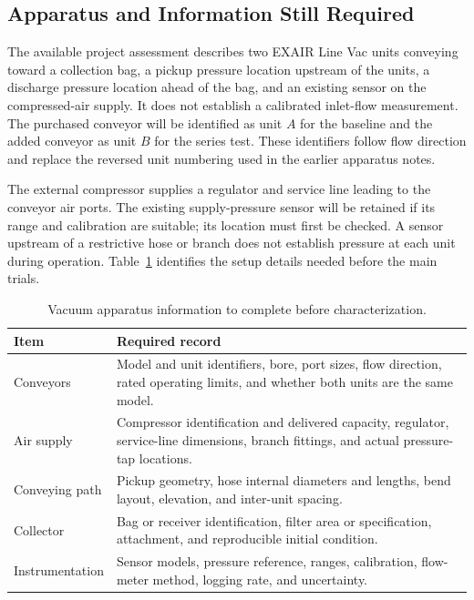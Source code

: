 \subsection{Apparatus and Information Still Required}
The available project assessment describes two EXAIR Line Vac units conveying toward a collection bag, a pickup pressure location upstream of the units, a discharge pressure location ahead of the bag, and an existing sensor on the compressed-air supply. It does not establish a calibrated inlet-flow measurement. The purchased conveyor will be identified as unit $A$ for the baseline and the added conveyor as unit $B$ for the series test. These identifiers follow flow direction and replace the reversed unit numbering used in the earlier apparatus notes.

The external compressor supplies a regulator and service line leading to the conveyor air ports. The existing supply-pressure sensor will be retained if its range and calibration are suitable; its location must first be checked. A sensor upstream of a restrictive hose or branch does not establish pressure at each unit during operation. Table~\ref{tab:vacuum-setup-status} identifies the setup details needed before the main trials.

\begin{table}[htbp]
\centering
\caption{Vacuum apparatus information to complete before characterization.}
\label{tab:vacuum-setup-status}
\begingroup\small\singlespacing
\renewcommand{\arraystretch}{1.2}
\begin{tabularx}{\textwidth}{@{}p{}X@{}}
\toprule
Item & Required record \\
\midrule
Conveyors & Model and unit identifiers, bore, port sizes, flow direction, rated operating limits, and whether both units are the same model. \\
Air supply & Compressor identification and delivered capacity, regulator, service-line dimensions, branch fittings, and actual pressure-tap locations. \\
Conveying path & Pickup geometry, hose internal diameters and lengths, bend layout, elevation, and inter-unit spacing. \\
Collector & Bag or receiver identification, filter area or specification, attachment, and reproducible initial condition. \\
Instrumentation & Sensor models, pressure reference, ranges, calibration, flow-meter method, logging rate, and uncertainty. \\
\bottomrule
\end{tabularx}
\endgroup
\end{table}


